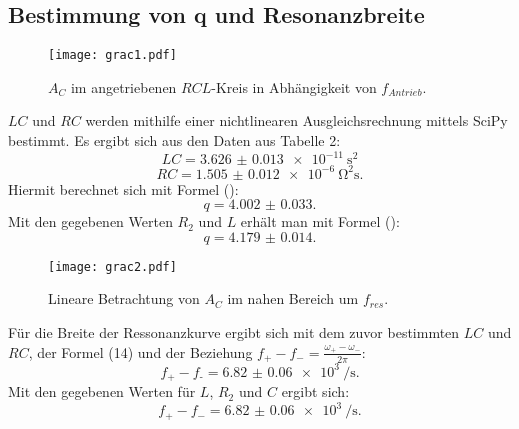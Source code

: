 \subsection{Bestimmung von q und Resonanzbreite}
\begin{figure}[H]
	\centering
	\caption{$A_C$ im angetriebenen $RCL$-Kreis in Abhängigkeit von $f_{Antrieb}$.}
	\texttt{[image: grac1.pdf]}
	\label{fig:grac1}
\end{figure}
$LC$ und $RC$ werden mithilfe einer nichtlinearen Ausgleichsrechnung mittels SciPy \cite{scipy} bestimmt. Es ergibt sich aus den Daten aus Tabelle 2: 
\begin{displaymath}
LC = \SI{3.626(13)e-11}{\second\squared}
\end{displaymath}
\begin{displaymath}
RC = \SI{1.505(12)e-6}{\ohm\squared\second}\text{.}
\end{displaymath}
Hiermit berechnet sich mit Formel ():
\begin{displaymath}
q = \num{4.002(33)}\text{.}
\end{displaymath}
Mit den gegebenen Werten $R_2$ und $L$ erhält man mit Formel ():
\begin{displaymath}
q = \num{4.179(14)}\text{.}
\end{displaymath}


\begin{figure}[H]
	\centering
	\caption{Lineare Betrachtung von $A_C$ im nahen Bereich um $f_{res}$.}
	\texttt{[image: grac2.pdf]}
	\label{fig:grac2}
\end{figure}

Für die Breite der Ressonanzkurve ergibt sich mit dem zuvor bestimmten $LC$ und $RC$, der Formel (14) und der Beziehung $f_+ - f_- = \frac{\omega_+ - \omega_-}{2\pi}$:
\begin{displaymath}
f_\text{+} - f_\text{-} = \SI{6.82(6)e3}{\per\second}\text{.}
\end{displaymath}
Mit den gegebenen Werten für $L$, $R_2$ und $C$ ergibt sich:
\begin{displaymath}
f_+ - f_- = \SI{6.82(6)e3}{\per\second}\text{.}
\end{displaymath}


